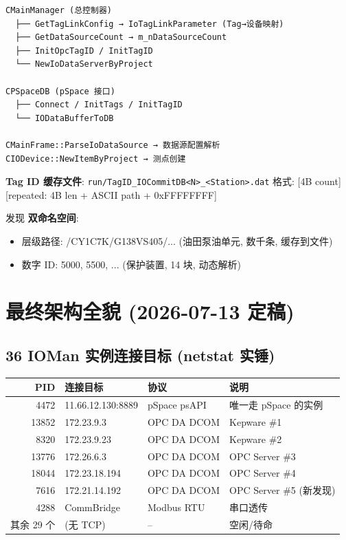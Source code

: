 \documentclass[12pt,a4paper]{ctexart}
\begin{document}
\begin{verbatim}
CMainManager (总控制器)
  ├── GetTagLinkConfig → IoTagLinkParameter (Tag→设备映射)
  ├── GetDataSourceCount → m_nDataSourceCount
  ├── InitOpcTagID / InitTagID
  └── NewIoDataServerByProject

CPSpaceDB (pSpace 接口)
  ├── Connect / InitTags / InitTagID
  └── IODataBufferToDB

CMainFrame::ParseIoDataSource → 数据源配置解析
CIODevice::NewItemByProject → 测点创建
\end{verbatim}

\textbf{Tag ID 缓存文件}: \texttt{run/TagID\_IOCommitDB<N>\_<Station>.dat}
格式: [4B count][repeated: 4B len + ASCII path + 0xFFFFFFFF]

发现 \textbf{双命名空间}:
\begin{itemize}[leftmargin=*]
  \item 层级路径: /CY1C7K/G138VS405/... (油田泵油单元, 数千条, 缓存到文件)
  \item 数字 ID: 5000, 5500, ... (保护装置, 14 块, 动态解析)
\end{itemize}

\section{最终架构全貌 (2026-07-13 定稿)}

\subsection{36 IOMan 实例连接目标 (netstat 实锤)}
\begin{table}[H]\centering
\begin{tabular}{rlll}
\toprule
\textbf{PID} & \textbf{连接目标} & \textbf{协议} & \textbf{说明} \\
\midrule
4472 & 11.66.12.130:8889 & pSpace psAPI & 唯一走 pSpace 的实例 \\
13852 & 172.23.9.3 & OPC DA DCOM & Kepware \#1 \\
8320 & 172.23.9.23 & OPC DA DCOM & Kepware \#2 \\
13776 & 172.26.6.3 & OPC DA DCOM & OPC Server \#3 \\
18044 & 172.23.18.194 & OPC DA DCOM & OPC Server \#4 \\
7616 & 172.21.14.192 & OPC DA DCOM & OPC Server \#5 (新发现) \\
4288 & CommBridge & Modbus RTU & 串口透传 \\
其余 29 个 & (无 TCP) & -- & 空闲/待命 \\
\bottomrule
\end{tabular}
\end{table}
\end{document}
